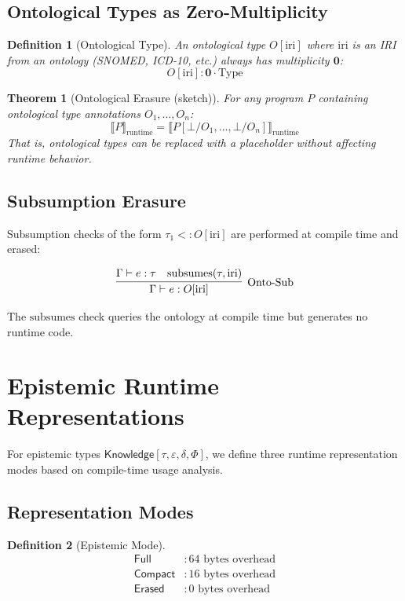 \documentclass[11pt]{article}
\newtheorem{definition}{Definition}
\newtheorem{theorem}{Theorem}
\newcommand{\zero}{\mathbf{0}}
\newcommand{\Knowledge}{\mathsf{Knowledge}}
\newcommand{\Full}{\mathsf{Full}}
\newcommand{\Compact}{\mathsf{Compact}}
\newcommand{\Erased}{\mathsf{Erased}}
\begin{document}
\subsection{Ontological Types as Zero-Multiplicity}

\begin{definition}[Ontological Type]
An ontological type $O[\text{iri}]$ where $\text{iri}$ is an IRI from an
ontology (SNOMED, ICD-10, etc.) always has multiplicity $\zero$:
\[
O[\text{iri}] : \zero \cdot \text{Type}
\]
\end{definition}

\begin{theorem}[Ontological Erasure (sketch)]
For any program $P$ containing ontological type annotations $O_1, \ldots, O_n$:
\[
\llbracket P \rrbracket_{\text{runtime}} = \llbracket P[\bot/O_1, \ldots, \bot/O_n] \rrbracket_{\text{runtime}}
\]
That is, ontological types can be replaced with a placeholder without
affecting runtime behavior.
\end{theorem}

\subsection{Subsumption Erasure}

Subsumption checks of the form $\tau_1 <: O[\text{iri}]$ are performed at
compile time and erased:

\[
\infer[\text{Onto-Sub}]{\Gamma \vdash e : O[\text{iri}]}
      {\Gamma \vdash e : \tau & \text{subsumes}(\tau, \text{iri})}
\]

The $\text{subsumes}$ check queries the ontology at compile time but generates
no runtime code.

\section{Epistemic Runtime Representations}

For epistemic types $\Knowledge[\tau, \varepsilon, \delta, \Phi]$, we define
three runtime representation modes based on compile-time usage analysis.

\subsection{Representation Modes}

\begin{definition}[Epistemic Mode]
\begin{align*}
\Full &: 64 \text{ bytes overhead} \\
\Compact &: 16 \text{ bytes overhead} \\
\Erased &: 0 \text{ bytes overhead}
\end{align*}
\end{definition}
\end{document}
